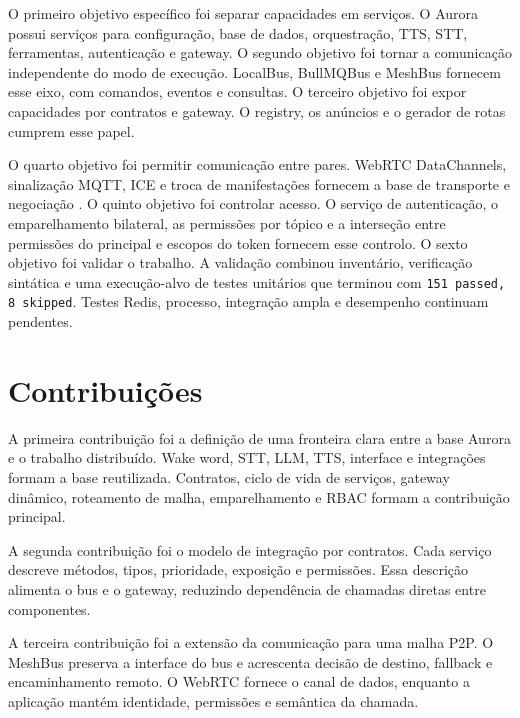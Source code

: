 O primeiro objetivo espec\'{i}fico foi separar capacidades em servi\c{c}os. O Aurora possui servi\c{c}os para configura\c{c}\~{a}o, base de dados, orquestra\c{c}\~{a}o, \gls{TTS}, \gls{STT}, ferramentas, autentica\c{c}\~{a}o e gateway. O segundo objetivo foi tornar a comunica\c{c}\~{a}o independente do modo de execu\c{c}\~{a}o. LocalBus, BullMQBus e MeshBus fornecem esse eixo, com comandos, eventos e consultas. O terceiro objetivo foi expor capacidades por contratos e gateway. O registry, os an\'{u}ncios e o gerador de rotas cumprem esse papel.

O quarto objetivo foi permitir comunica\c{c}\~{a}o entre pares. WebRTC DataChannels, sinaliza\c{c}\~{a}o MQTT, ICE e troca de manifesta\c{c}\~{o}es fornecem a base de transporte e negocia\c{c}\~{a}o \cite{w3c_webrtc_2025,rfc8831_datachannels,rfc8445_ice,oasis_mqtt_2019}. O quinto objetivo foi controlar acesso. O servi\c{c}o de autentica\c{c}\~{a}o, o emparelhamento bilateral, as permiss\~{o}es por t\'{o}pico e a interse\c{c}\~{a}o entre permiss\~{o}es do principal e escopos do token fornecem esse controlo. O sexto objetivo foi validar o trabalho. A valida\c{c}\~{a}o combinou invent\'{a}rio, verifica\c{c}\~{a}o sint\'{a}tica e uma execu\c{c}\~{a}o-alvo de testes unit\'{a}rios que terminou com \texttt{151 passed, 8 skipped}. Testes Redis, processo, integra\c{c}\~{a}o ampla e desempenho continuam pendentes.

\section{Contribui\c{c}\~{o}es}
\label{sec:contribuicoes-finais}

A primeira contribui\c{c}\~{a}o foi a defini\c{c}\~{a}o de uma fronteira clara entre a base Aurora e o trabalho distribu\'{i}do. Wake word, STT, LLM, TTS, interface e integra\c{c}\~{o}es formam a base reutilizada. Contratos, ciclo de vida de servi\c{c}os, gateway din\^{a}mico, roteamento de malha, emparelhamento e RBAC formam a contribui\c{c}\~{a}o principal.

A segunda contribui\c{c}\~{a}o foi o modelo de integra\c{c}\~{a}o por contratos. Cada servi\c{c}o descreve m\'{e}todos, tipos, prioridade, exposi\c{c}\~{a}o e permiss\~{o}es. Essa descri\c{c}\~{a}o alimenta o bus e o gateway, reduzindo depend\^{e}ncia de chamadas diretas entre componentes.

A terceira contribui\c{c}\~{a}o foi a extens\~{a}o da comunica\c{c}\~{a}o para uma malha P2P. O MeshBus preserva a interface do bus e acrescenta decis\~{a}o de destino, fallback e encaminhamento remoto. O WebRTC fornece o canal de dados, enquanto a aplica\c{c}\~{a}o mant\'{e}m identidade, permiss\~{o}es e sem\^{a}ntica da chamada.

